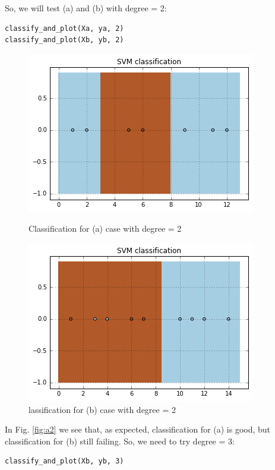 \documentclass[a4paper, 12pt]{article}
\begin{document}
So, we will test (a) and (b) with degree = 2:
\lstset{language=Python}
\begin{lstlisting}[frame=single]
classify_and_plot(Xa, ya, 2)
classify_and_plot(Xb, yb, 2)
\end{lstlisting}

\begin{figure}[!htb]
  \includegraphics[width=\linewidth]{a2}
  \caption{Classification for (a) case with degree = 2}\label{fig:a2}
\endminipage\hfill
{}
  \includegraphics[width=\linewidth]{b2}
  \caption{lassification for (b) case with degree = 2}\label{fig:b2}
\endminipage\hfill
\end{figure}


In Fig. \ref{fig:a2} we see that, as expected, classification for (a) is good, but classification for (b) still failing. So, we need to try degree = 3:
\lstset{language=Python}
\begin{lstlisting}[frame=single]
classify_and_plot(Xb, yb, 3)
\end{lstlisting}
\end{document}
